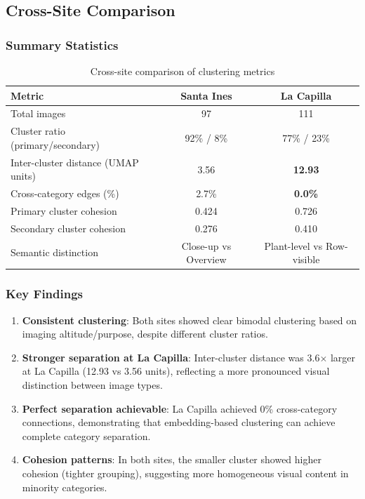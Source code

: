 \subsection{Cross-Site Comparison}

\subsubsection{Summary Statistics}

\begin{table}[H]
\centering
\caption{Cross-site comparison of clustering metrics}
\label{tab:comparison}
\begin{tabular}{lcc}
\toprule
\textbf{Metric} & \textbf{Santa Ines} & \textbf{La Capilla} \\
\midrule
Total images & 97 & 111 \\
Cluster ratio (primary/secondary) & 92\% / 8\% & 77\% / 23\% \\
Inter-cluster distance (UMAP units) & 3.56 & \textbf{12.93} \\
Cross-category edges (\%) & 2.7\% & \textbf{0.0\%} \\
Primary cluster cohesion & 0.424 & 0.726 \\
Secondary cluster cohesion & 0.276 & 0.410 \\
Semantic distinction & Close-up vs Overview & Plant-level vs Row-visible \\
\bottomrule
\end{tabular}
\end{table}

\subsubsection{Key Findings}

\begin{enumerate}
    \item \textbf{Consistent clustering}: Both sites showed clear bimodal clustering based on imaging altitude/purpose, despite different cluster ratios.

    \item \textbf{Stronger separation at La Capilla}: Inter-cluster distance was 3.6$\times$ larger at La Capilla (12.93 vs 3.56 units), reflecting a more pronounced visual distinction between image types.

    \item \textbf{Perfect separation achievable}: La Capilla achieved 0\% cross-category connections, demonstrating that embedding-based clustering can achieve complete category separation.

    \item \textbf{Cohesion patterns}: In both sites, the smaller cluster showed higher cohesion (tighter grouping), suggesting more homogeneous visual content in minority categories.
\end{enumerate}

